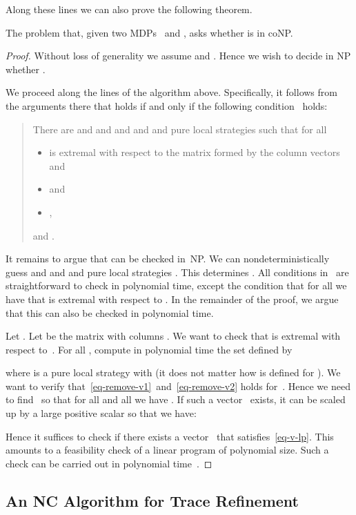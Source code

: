 Along these lines we can also prove the following theorem.

\begin{thm}\label{thm-coNP-result}
The problem that, given two MDPs~ and , asks whether  is in {\sf coNP}.
\end{thm}

\begin{proof}
Without loss of generality we assume
 and
.
Hence we wish to decide in {\sf NP} whether .

We proceed along the lines of the algorithm above.
Specifically, it follows from the arguments there that  holds if and only if the following condition~ holds:
\begin{quote}
There are  and  and 
and 
and  and pure local strategies  such that for all 
\begin{itemize}
\item  is extremal with respect to the matrix formed by the column vectors  and
\item  and
\item ,
\end{itemize}
and .
\end{quote}
It remains to argue that  can be checked in~{\sf NP}.
We can nondeterministically guess  and  and  and pure local strategies .
This determines .
All conditions in~ are straightforward to check in polynomial time, except the condition that for all  we have that  is extremal with respect to .
In the remainder of the proof, we argue that this can also be checked in polynomial time.

Let .
Let  be the matrix with columns .
We want to check that  is extremal with respect to~.
For all , compute in polynomial time the set  defined by

where  is a pure local strategy with  (it does not matter how  is defined for ).
We want to verify that~\eqref{eq-remove-v1}~and~\eqref{eq-remove-v2} holds for~.
Hence we need to find~ so that for all  and all  we have .
If such a vector~ exists, it can be scaled up by a large positive scalar so that we have:

Hence it suffices to check if there exists a vector~ that satisfies~\eqref{eq-v-lp}.
This amounts to a feasibility check of a linear program of polynomial size.
Such a check can be carried out in polynomial time~\cite{Khachiyan79}.
\end{proof}

\subsection{An NC Algorithm for Trace Refinement}\label{subsec:algo_nc_trace_refinement}

